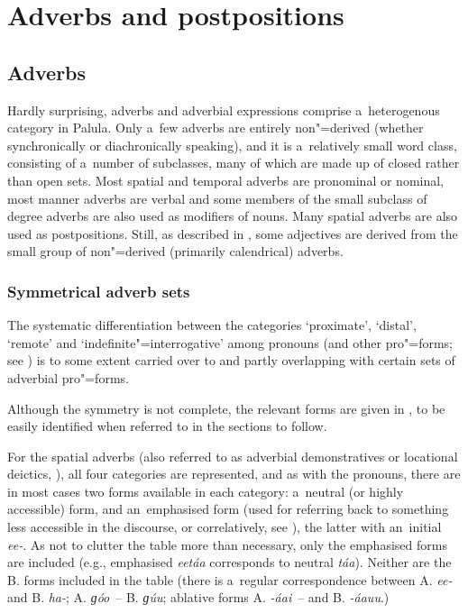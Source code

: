 \chapter{Adverbs and postpositions}
\label{chap:7}

\section{Adverbs}
\label{sec:7-1}


Hardly surprising, adverbs and adverbial expressions comprise a~heterogenous category in Palula. Only a~few adverbs are entirely non"=derived (whether synchronically or diachronically speaking), and it is a~relatively small word class, consisting of a~number of subclasses, many of which are made up of closed rather than open sets. Most spatial and temporal adverbs are pronominal or nominal, most manner adverbs are verbal and some members of the small subclass of degree adverbs are also used as modifiers of nouns. Many spatial adverbs are also used as postpositions. Still, as described in , some adjectives are derived from the small group of non"=derived (primarily calendrical) adverbs.


\subsection{Symmetrical adverb sets}
\label{subsec:7-1-1}

The systematic differentiation between the categories `proximate', `distal', `remote' and `indefinite"=interrogative' among pronouns (and other pro"=forms; see ) is to some extent carried over to and partly overlapping with certain sets of adverbial pro"=forms. 



Although the symmetry is not complete, the relevant forms are given in , to be easily identified when referred to in the sections to follow.



For the spatial adverbs (also referred to as adverbial demonstratives or locational deictics, \citealt[431]{diessel2006}), all four categories are represented, and as with the pronouns, there are in most cases two forms available in each category: a~neutral (or highly accessible) form, and an~emphasised form (used for referring back to something less accessible in the discourse, or correlatively, see ), the latter with an~initial \textit{ee-}. As not to clutter the table more than necessary, only the emphasised forms are included (e.g., emphasised \textit{eetáa} corresponds to neutral \textit{táa}). Neither are the B. forms included in the table (there is a~regular correspondence between A. \textit{ee-} and B. \textit{ha-}; A. \textit{ɡóo}~-- B. \textit{ɡúu}; ablative forms A. \textit{-áai}~-- and B. \textit{-áauu}.)



